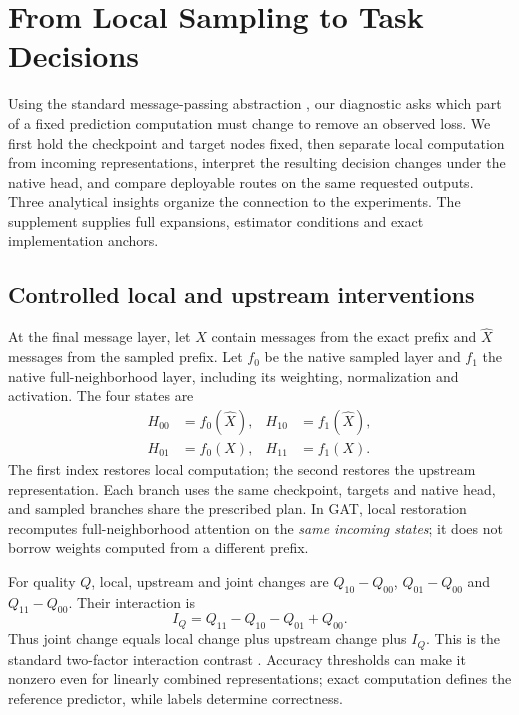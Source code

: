 \documentclass[sigconf, nonacm]{acmart}
\begin{document}
\section{From Local Sampling to Task Decisions}
\label{sec:analysis}
Using the standard message-passing abstraction \cite{gilmer2017neural}, our diagnostic asks which part of a fixed prediction computation must change to remove an observed loss. We first hold the checkpoint and target nodes fixed, then separate local computation from incoming representations, interpret the resulting decision changes under the native head, and compare deployable routes on the same requested outputs. Three analytical insights organize the connection to the experiments. The supplement supplies full expansions, estimator conditions and exact implementation anchors.

\subsection{Controlled local and upstream interventions}
At the final message layer, let $X$ contain messages from the exact prefix and $\widehat X$ messages from the sampled prefix. Let $f_0$ be the native sampled layer and $f_1$ the native full-neighborhood layer, including its weighting, normalization and activation. The four states are
\begin{align}
H_{00}&=f_0(\widehat X), & H_{10}&=f_1(\widehat X),\\
H_{01}&=f_0(X), & H_{11}&=f_1(X).
\label{eq:corners}
\end{align}
The first index restores local computation; the second restores the upstream representation. Each branch uses the same checkpoint, targets and native head, and sampled branches share the prescribed plan. In GAT, local restoration recomputes full-neighborhood attention on the \emph{same incoming states}; it does not borrow weights computed from a different prefix.

For quality $Q$, local, upstream and joint changes are $Q_{10}-Q_{00}$, $Q_{01}-Q_{00}$ and $Q_{11}-Q_{00}$. Their interaction is
\begin{equation}
I_Q=Q_{11}-Q_{10}-Q_{01}+Q_{00}.
\label{eq:interaction}
\end{equation}
Thus joint change equals local change plus upstream change plus $I_Q$. This is the standard two-factor interaction contrast \cite{nist2012handbook}. Accuracy thresholds can make it nonzero even for linearly combined representations; exact computation defines the reference predictor, while labels determine correctness.
\end{document}
